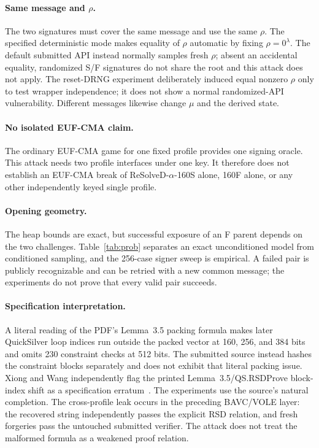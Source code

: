 \documentclass[11pt,a4paper]{article}
\begin{document}
\paragraph{Same message and $\rho$.}
The two signatures must cover the same message and use the same $\rho$.  The
specified deterministic mode makes equality of $\rho$ automatic by fixing
$\rho=0^\lambda$.
The default submitted API instead normally samples fresh $\rho$; absent an
accidental equality, randomized S/F signatures do not share the root and this
attack does not apply.  The reset-DRNG experiment deliberately induced equal
nonzero $\rho$ only to test wrapper independence; it does not show a normal
randomized-API vulnerability.  Different messages likewise change $\mu$ and
the derived state.

\paragraph{No isolated EUF-CMA claim.}
The ordinary EUF-CMA game for one fixed profile provides one signing oracle.
This attack needs two profile interfaces under one key.  It therefore does not
establish an EUF-CMA break of ReSolveD-$\alpha$-160S alone, 160F alone, or any
other independently keyed single profile.

\paragraph{Opening geometry.}
The heap bounds are exact, but successful exposure of an F parent depends on the
two challenges.  Table~\ref{tab:prob} separates an exact unconditioned model from
conditioned sampling, and the 256-case signer sweep is empirical.  A failed pair
is publicly recognizable and can be retried with a new common message; the
experiments do not prove that every valid pair succeeds.

\paragraph{Specification interpretation.}
A literal reading of the PDF's Lemma~3.5 packing formula makes later QuickSilver
loop indices run outside the packed vector at 160, 256, and 384 bits and omits
230 constraint checks at 512 bits.  The submitted source instead hashes the
constraint blocks separately and does not exhibit that literal packing issue.
Xiong and Wang independently flag the printed Lemma~3.5/QS.RSDProve
block-index shift as a specification erratum~\cite{xiongwang2026}.  The
experiments use the source's natural completion.  The cross-profile leak occurs
in the preceding BAVC/VOLE layer: the recovered string independently passes the
explicit RSD relation, and fresh forgeries pass the untouched submitted
verifier.  The attack does not treat the malformed formula as a weakened proof
relation.
\end{document}
